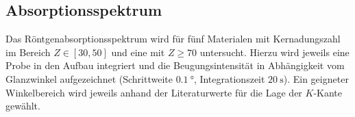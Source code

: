 \subsection{Absorptionsspektrum}
Das Röntgenabsorptionsspektrum wird für fünf Materialen mit Kernadungszahl im Bereich $Z \in \left[30, 50 \right]$ und eine
mit $Z \geq 70$ untersucht. Hierzu wird jeweils eine Probe in den Aufbau integriert und die Beugungsintensität in Abhängigkeit
vom Glanzwinkel aufgezeichnet (Schrittweite $\SI{0.1}{\degree}$, Integrationszeit $\SI{20}{\second}$).
Ein geigneter Winkelbereich wird jeweils anhand der Literaturwerte für die Lage der $K$-Kante gewählt.
